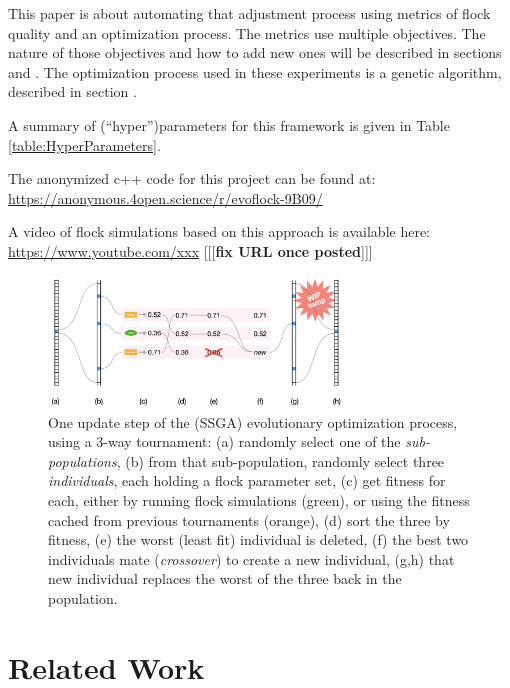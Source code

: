 \documentclass[letterpaper]{article}
\begin{document}
This paper is about automating that adjustment process using metrics of flock quality and an optimization process. The metrics use multiple objectives. The nature of those objectives and how to add new ones will be described in sections  and . The optimization process used in these experiments is a genetic algorithm, described in section .

A summary of (``hyper'')parameters for this framework is given in Table \ref{table:HyperParameters}.

The anonymized c++ code for this project can be found at:
\scriptsize
\url{https://anonymous.4open.science/r/evoflock-9B09/}
\normalsize

A video of flock simulations based on this approach is available here:
\scriptsize
\url{https://www.youtube.com/xxx}
\normalsize
[[[\textbf{fix URL once posted}]]]


\begin{figure}[t]
    \centering
    \includegraphics[width=0.7\textwidth]{images/temp_evo_update.png}
    \caption{One update step of the (SSGA) evolutionary optimization process, using a 3-way tournament: (a) randomly select one of the \textit{sub-populations}, (b) from that sub-population, randomly select three \textit{individuals}, each holding a flock parameter set, (c) get fitness for each, either by running flock simulations (green), or using the fitness cached from previous tournaments (orange), (d) sort the three by fitness, (e) the worst (least fit) individual is deleted, (f) the best two individuals mate (\textit{crossover}) to create a new individual, (g,h) that new individual replaces the worst of the three back in the population.}
    \label{fig:temp_evo_update}
\end{figure}


\section{Related Work}
\label{sec:related}
\end{document}
